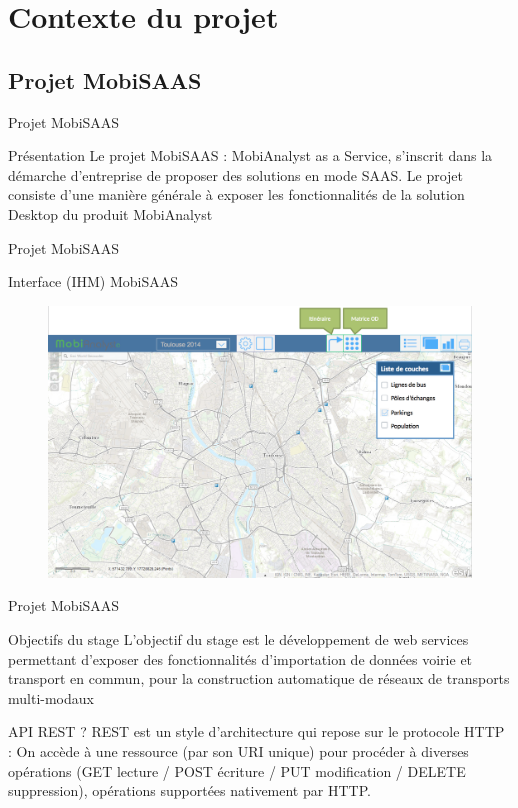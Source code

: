\documentclass[utf8,compress]{beamer}
\begin{document}
\section{Contexte du projet}
\subsection{Projet MobiSAAS}
\begin{frame}{Projet MobiSAAS}
\begin{block}{Présentation}
Le projet \og MobiSAAS \fg : MobiAnalyst as a Service, s'inscrit dans la démarche d'entreprise de proposer des solutions en mode SAAS. Le projet consiste d'une manière générale à exposer les fonctionnalités de la solution Desktop du produit \og MobiAnalyst \fg
\end{block}
\end{frame}
\begin{frame}{Projet MobiSAAS}
\begin{block}{Interface (IHM) MobiSAAS}
\begin{figure}[h]
    \center
    \includegraphics[width=\textwidth]{images/MobiSAAS_IHM.png}
\end{figure}
\end{block}
\end{frame}
\begin{frame}{Projet MobiSAAS}
\begin{block}{Objectifs du stage}
L'objectif du stage est le développement de web services permettant d'exposer des fonctionnalités d'importation de données voirie et transport en commun, pour la construction automatique de réseaux de transports multi-modaux
\end{block}
\begin{block}{API REST ?}
REST est un style d'architecture qui repose sur le protocole HTTP : On accède à une ressource (par son URI unique) pour procéder à diverses opérations (GET lecture / POST écriture / PUT modification / DELETE suppression), opérations supportées nativement par HTTP.
\end{block}
\end{frame}
\end{document}
